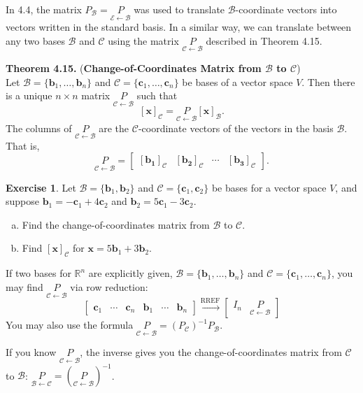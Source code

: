 \documentclass[10pt]{book}
\newcommand{\boxcolor}{gray!30}
\newenvironment{boxme}{\begin{mdframed}[backgroundcolor=\boxcolor,linewidth=0pt,nobreak=true]}{\end{mdframed}}
\newenvironment{boxthm}{\begin{mdframed}[backgroundcolor=\boxcolor,nobreak=true]}{\end{mdframed}}
\newenvironment{boxdef}{\begin{mdframed}[backgroundcolor=\boxcolor,linewidth=0pt,nobreak=true]}{\end{mdframed}}
\theoremstyle{definition}
\newtheorem{exercise}{Exercise}[section]
\newcommand{\R}{\mathbb{R}}
\newcommand{\B}{\mathscr{B}}
\newcommand{\C}{\mathscr{C}}
\newcommand{\E}{\mathscr{E}}
\newcommand{\vect}[1]{\ensuremath{\boldsymbol{\mathbf{#1}}}}
\newcommand{\vectset}[3][v]{\{\vect{#1}_{#2},\ldots,\vect{#1}_{#3}\}}
\newcommand{\vectB}[1][x]{[\vect{#1}]_\B}
\newcommand{\vectC}[1][x]{[\vect{#1}]_\C}
\newcommand{\CoC}[2]{\underset{#2\leftarrow #1}{P}}
\begin{document}
\begin{boxdef}
	In 4.4, the matrix $P_\B=\CoC{\B}{\E}$ was used to translate $\B$-coordinate vectors into vectors written in the standard basis. In a similar way, we can translate between any two bases $\B$ and $\C$ using the matrix $\CoC{\B}{\C}$ described in Theorem 4.15.
\end{boxdef}
\vspace{-1em}
\begin{boxthm}
	\textbf{Theorem 4.15.} 
	(\textbf{Change-of-Coordinates Matrix from $\boldsymbol{\B}$ to $\boldsymbol{\C}$}) \\
	Let $\B=\vectset[b]{1}{n}$ and $\C=\vectset[c]{1}{n}$ be bases of a vector space $V$. Then there is a unique $n\times n$ matrix $\CoC{\B}{\C}$ such that
	$$ \vectC = \CoC{\B}{\C}\vectB. $$
	The columns of $\CoC{\B}{\C}$ are the $\C$-coordinate vectors of the vectors in the basis $\B$. That is,
	$$ \CoC{\B}{\C} = \begin{bmatrix}\vectC[b_1]&\vectC[b_2]&\cdots&\vectC[b_3]\end{bmatrix}.$$
\end{boxthm}


\begin{exercise} %
	Let $\B=\{\vect{b}_1,\vect{b}_2\}$ and $\C=\{\vect{c}_1,\vect{c}_2\}$ be bases for a vector space $V$, and suppose $\vect{b}_1=-\vect{c}_1+4\vect{c}_2$ and $\vect{b}_2=5\vect{c}_1-3\vect{c}_2$.
	\begin{multicols}{2}
		\begin{enumerate}[(a)]
			\item Find the change-of-coordinates matrix from $\B$ to $\C$.
			\item Find $\vectC[x]$ for $\vect{x}=5\vect{b}_1+3\vect{b}_2$.
		\end{enumerate}
	\end{multicols}
\end{exercise}
\vfill


\newpage

\begin{boxme}
	If two bases for $\R^n$ are explicitly given, $\B=\vectset[b]{1}{n}$ and $\C=\vectset[c]{1}{n}$, you may find $\CoC{\B}{\C}$ via row reduction:
	$$\begin{bmatrix}\vect{c}_1&\cdots&\vect{c}_n&\vect{b}_1&\cdots&\vect{b}_n\end{bmatrix} \xrightarrow{\text{RREF}} \begin{bmatrix}I_n&\CoC{\B}{\C}\end{bmatrix}$$
	You may also use the formula $\CoC{\B}{\C}=(P_\C)^{-1}P_\B$.
	
	If you know $\CoC{\B}{\C}$, the inverse gives you the change-of-coordinates matrix from $\C$ to $\B$: $\CoC{\C}{\B} = \left(\CoC{\B}{\C}\right)^{-1}$.
\end{boxme}
\end{document}
